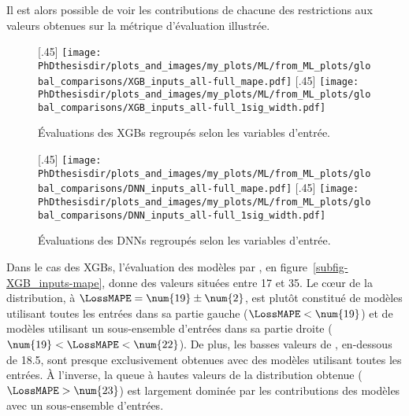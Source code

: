 Il est alors possible de voir les contributions de chacune des restrictions aux valeurs obtenues sur la métrique d'évaluation illustrée.
\begin{figure}[h]
\centering

[.45\textwidth]
{\texttt{[image: \\PhDthesisdir/plots\_and\_images/my\_plots/ML/from\_ML\_plots/global\_comparisons/XGB\_inputs\_all-full\_mape.pdf]}\vspace{-\baselineskip}}
\hfill
{}[.45\textwidth]
{\texttt{[image: \\PhDthesisdir/plots\_and\_images/my\_plots/ML/from\_ML\_plots/global\_comparisons/XGB\_inputs\_all-full\_1sig\_width.pdf]}\vspace{-\baselineskip}}

\caption{Évaluations des XGBs regroupés selon les variables d'entrée.}
\label{fig-XGB_inputs}
\end{figure}
\begin{figure}[h]
\centering

[.45\textwidth]
{\texttt{[image: \\PhDthesisdir/plots\_and\_images/my\_plots/ML/from\_ML\_plots/global\_comparisons/DNN\_inputs\_all-full\_mape.pdf]}\vspace{-\baselineskip}}
\hfill
{}[.45\textwidth]
{\texttt{[image: \\PhDthesisdir/plots\_and\_images/my\_plots/ML/from\_ML\_plots/global\_comparisons/DNN\_inputs\_all-full\_1sig\_width.pdf]}\vspace{-\baselineskip}}

\caption{Évaluations des DNNs regroupés selon les variables d'entrée.}
\label{fig-DNN_inputs}
\end{figure}
\par
Dans le cas des XGBs,
l'évaluation des modèles par \LossMAPE, en figure~\ref{subfig-XGB_inputs-mape},
donne des valeurs situées entre \num{17} et \num{35}.
Le cœur de la distribution,
à $\LossMAPE=\num{19}\pm\num{2}$,
est plutôt constitué
de modèles utilisant
toutes les entrées
dans sa partie gauche ($\LossMAPE<\num{19}$)
et
de modèles utilisant
un sous-ensemble d'entrées
dans sa partie droite ($\num{19}<\LossMAPE<\num{22}$).
De plus, les basses valeurs de \LossMAPE, en-dessous de \num{18.5},
sont presque exclusivement obtenues avec des modèles utilisant toutes les entrées.
À l'inverse, la queue à hautes valeurs de la distribution obtenue ($\LossMAPE>\num{23}$) est largement dominée par les contributions des modèles avec un sous-ensemble d'entrées.
